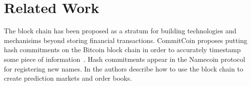 \section{Related Work}
\label{sec:related}

The block chain has been proposed as a stratum for building technologies and mechanisims beyond storing financial transactions. CommitCoin proposes putting hash commitments on the Bitcoin block chain in order to accurately timestamp some piece of information~\cite{clark2012commitcoin}. Hash commitments appear in the Namecoin protocol for registering new names. In  \cite{bonneau2014decentralizing} the authors describe how to use the block chain to create prediction markets and order books.